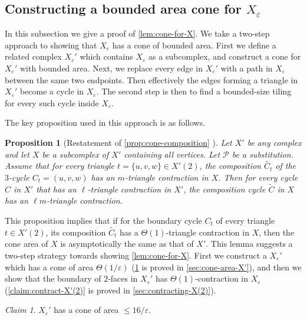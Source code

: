 \documentclass[10pt,a4paper]{article}
\newcommand{\prettyref}[1]{\cref{#1}}
\newtheorem{proposition}[theorem]{Proposition}
\theoremstyle{definition}
\theoremstyle{remark}
\newtheorem{claim}[theorem]{Claim}
\newcommand{\set}[1]{\{#1\}}
\renewcommand{\le}{\leqslant}
\numberwithin{equation}{section}
\let\pref=\prettyref
\begin{document}
\subsection[Constructing a bounded area cone for the Johnson complex]{Constructing a bounded area cone for \(X_\varepsilon\)}\label{sec:cone-for-X}
In this subsection we give a proof of \pref{lem:cone-for-X}. We take a two-step approach to showing that $X_\varepsilon$ has a cone of bounded area. 
First we define a related complex $X_\varepsilon'$ which contains $X_\varepsilon$ as a subcomplex, and construct a cone for $X_\varepsilon'$ with bounded area. Next, we replace every edge in $X_\varepsilon'$ with a path in $X_\varepsilon$ between the same two endpoints. Then effectively the edges forming a triangle in $X_\varepsilon'$ become a cycle in $X_\varepsilon$. The second step is then to find a bounded-size tiling for every such cycle inside $X_\varepsilon$.

The key proposition used in this approach is as follows. 
\begin{proposition}[Restatement of \pref{prop:cone-composition} ] \label{lem:cone-area-composition}
    Let \(X'\) be any complex and let \(X\) be a subcomplex of \(X'\) containing all vertices. Let \(\mathcal{P}\) be a substitution. Assume that for every triangle \(t=\set{u,v,w} \in X'(2)\), the composition \(\tilde{C_t}\) of the \(3\)-cycle \(C_t=(u,v,w)\) has an \(m\)-triangle contraction in \(X\). 
    Then for every cycle $C$ in $X'$ that has an $\ell$-triangle contraction in $X'$, the composition cycle $\tilde{C}$ in $X$ has an $\ell m$-triangle contraction.
\end{proposition}

This proposition implies that if 
for the boundary cycle $C_t$ of every triangle $t \in X'(2)$, its composition $\tilde{C_t}$ has a $\Theta(1)$-triangle contraction in $X$, then the cone area of $X$ is asymptotically the same as that of $X'$.
This lemma suggests a two-step strategy towards showing \pref{lem:cone-for-X}. First we construct a $X_\varepsilon'$ which has a cone of area $\Theta(1/\varepsilon)$ (\pref{claim:X'-good-cone} is proved in \pref{sec:cone-area-X'}), and then we show that the boundary of $2$-faces in $X_\varepsilon'$ has $\Theta(1)$-contraction in $X_\varepsilon$ (\pref{claim:contract-X'(2)} is proved in \pref{sec:contracting-X(2)}).

\begin{claim} \label{claim:X'-good-cone}
    $X_\varepsilon'$ has a cone of area \(\le 16/\varepsilon \).
\end{claim}
\end{document}
